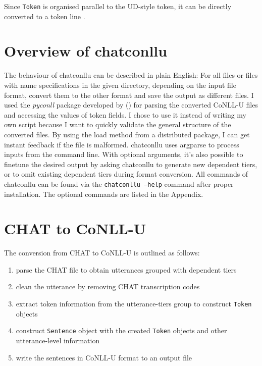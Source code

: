 Since \texttt{Token} is organised parallel to the UD-style token, it can be directly converted to a token line .

\section{Overview of chatconllu}

The behaviour of chatconllu can be described in plain English: For all files or files with name specifications in the given directory, depending on the input file format, convert them to the other format and save the output as different files. I used the \emph{pyconll}  package developed by (\cite{pyconll}) for parsing the converted CoNLL-U files and accessing the values of token fields. I chose to use it instead of writing my own script because I want to quickly validate the general structure of the converted files. By using the load method from a distributed package, I can get instant feedback if the file is malformed. chatconllu uses argparse to process inputs from the command line. With optional arguments, it's also possible to finetune the desired output by asking chatconllu to generate new dependent tiers, or to omit existing dependent tiers during format conversion. All commands of chatconllu can be found via the \texttt{chatconllu --help} command after proper installation. The optional commands are listed in the Appendix.

\section{CHAT to CoNLL-U}

The conversion from CHAT to CoNLL-U is outlined as follows:
\begin{enumerate}
	\item parse the CHAT file to obtain utterances grouped with dependent tiers
	\item clean the utterance by removing CHAT transcription codes
	\item extract token information from the utterance-tiers group to construct \texttt{Token} objects
	\item construct \texttt{Sentence} object with the created \texttt{Token} objects and other utterance-level information
	\item write the sentences in CoNLL-U format to an output file
\end{enumerate}


